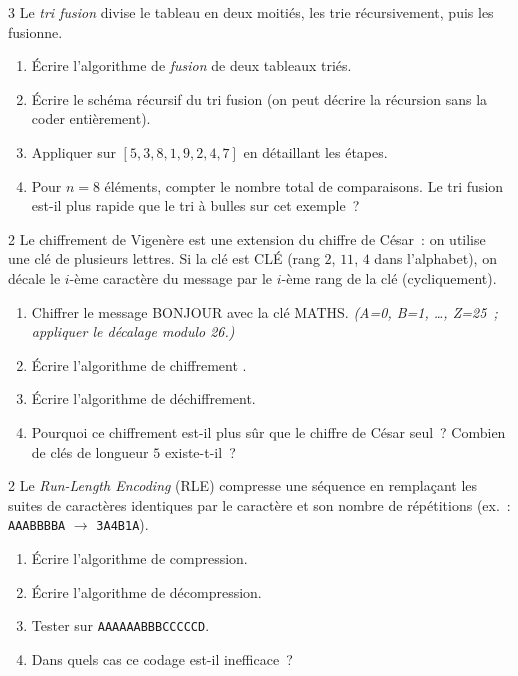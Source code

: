 \begin{probleme}{3}
Le \emph{tri fusion} divise le tableau en deux moiti\'es,
les trie r\'ecursivement, puis les fusionne.
\begin{enumerate}
  \item \'Ecrire l'algorithme de \emph{fusion} de deux tableaux tri\'es.
  \item \'Ecrire le sch\'ema r\'ecursif du tri fusion
        (on peut d\'ecrire la r\'ecursion sans la coder enti\`erement).
  \item Appliquer sur $[5,3,8,1,9,2,4,7]$ en d\'etaillant les \'etapes.
  \item Pour $n=8$ \'el\'ements, compter le nombre total de comparaisons.
        Le tri fusion est-il plus rapide que le tri \`a bulles sur cet exemple~?
\end{enumerate}
\end{probleme}

\begin{probleme}{2}
Le chiffrement de Vigen\`ere est une extension du chiffre de C\'esar~: on
utilise une cl\'e de plusieurs lettres. Si la cl\'e est \og CLÉ\fg{} (rang
$2$, $11$, $4$ dans l'alphabet), on d\'ecale le $i$-\`eme caract\`ere
du message par le $i$-\`eme rang de la cl\'e (cycliquement).
\begin{enumerate}
  \item Chiffrer le message \og BONJOUR\fg{} avec la cl\'e \og MATHS\fg.
        \emph{(A=0, B=1, \ldots, Z=25~; appliquer le d\'ecalage modulo 26.)}
  \item \'Ecrire l'algorithme de chiffrement \computer.
  \item \'Ecrire l'algorithme de d\'echiffrement.
  \item Pourquoi ce chiffrement est-il plus s\^ur que le chiffre de C\'esar seul~?
        Combien de cl\'es de longueur $5$ existe-t-il~?
\end{enumerate}
\end{probleme}

\begin{probleme}{2}
Le \emph{Run-Length Encoding} (RLE) compresse une s\'equence en
remplaçant les suites de caract\`eres identiques par le caract\`ere
et son nombre de r\'ep\'etitions (ex.~: \texttt{AAABBBBA} $\to$
\texttt{3A4B1A}).
\begin{enumerate}
  \item \'Ecrire l'algorithme de compression.
  \item \'Ecrire l'algorithme de d\'ecompression.
  \item Tester sur \texttt{AAAAAABBBCCCCCD}.
  \item Dans quels cas ce codage est-il inefficace~?
\end{enumerate}
\end{probleme}

